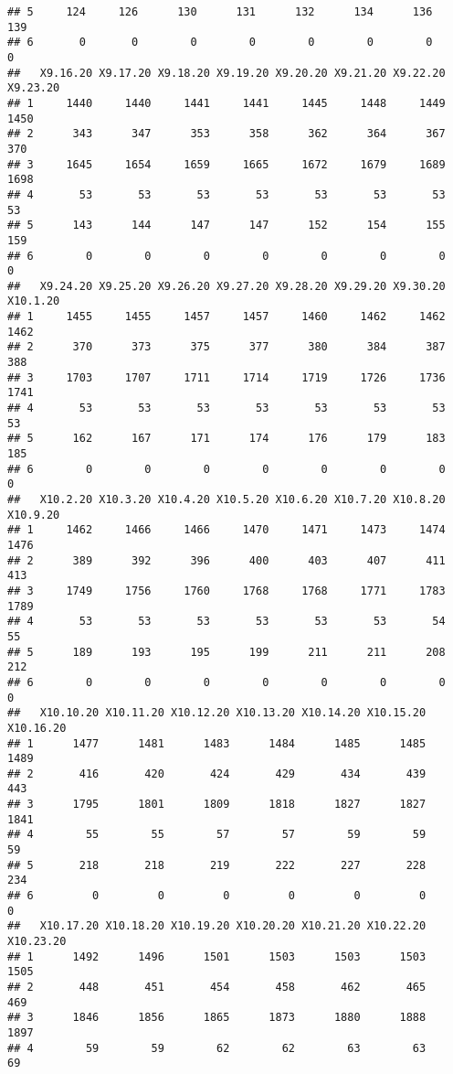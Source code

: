 \documentclass[
]{article}
\begin{document}
\begin{verbatim}
## 5     124     126      130      131      132      134      136      139
## 6       0       0        0        0        0        0        0        0
##   X9.16.20 X9.17.20 X9.18.20 X9.19.20 X9.20.20 X9.21.20 X9.22.20 X9.23.20
## 1     1440     1440     1441     1441     1445     1448     1449     1450
## 2      343      347      353      358      362      364      367      370
## 3     1645     1654     1659     1665     1672     1679     1689     1698
## 4       53       53       53       53       53       53       53       53
## 5      143      144      147      147      152      154      155      159
## 6        0        0        0        0        0        0        0        0
##   X9.24.20 X9.25.20 X9.26.20 X9.27.20 X9.28.20 X9.29.20 X9.30.20 X10.1.20
## 1     1455     1455     1457     1457     1460     1462     1462     1462
## 2      370      373      375      377      380      384      387      388
## 3     1703     1707     1711     1714     1719     1726     1736     1741
## 4       53       53       53       53       53       53       53       53
## 5      162      167      171      174      176      179      183      185
## 6        0        0        0        0        0        0        0        0
##   X10.2.20 X10.3.20 X10.4.20 X10.5.20 X10.6.20 X10.7.20 X10.8.20 X10.9.20
## 1     1462     1466     1466     1470     1471     1473     1474     1476
## 2      389      392      396      400      403      407      411      413
## 3     1749     1756     1760     1768     1768     1771     1783     1789
## 4       53       53       53       53       53       53       54       55
## 5      189      193      195      199      211      211      208      212
## 6        0        0        0        0        0        0        0        0
##   X10.10.20 X10.11.20 X10.12.20 X10.13.20 X10.14.20 X10.15.20 X10.16.20
## 1      1477      1481      1483      1484      1485      1485      1489
## 2       416       420       424       429       434       439       443
## 3      1795      1801      1809      1818      1827      1827      1841
## 4        55        55        57        57        59        59        59
## 5       218       218       219       222       227       228       234
## 6         0         0         0         0         0         0         0
##   X10.17.20 X10.18.20 X10.19.20 X10.20.20 X10.21.20 X10.22.20 X10.23.20
## 1      1492      1496      1501      1503      1503      1503      1505
## 2       448       451       454       458       462       465       469
## 3      1846      1856      1865      1873      1880      1888      1897
## 4        59        59        62        62        63        63        69

\end{verbatim}
\end{document}
